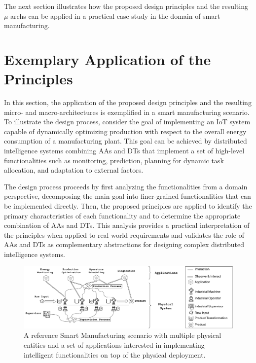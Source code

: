 The next section illustrates how the proposed design principles and the resulting $\mu$-archs can be applied in a practical case study in the domain of smart manufacturing.

\section{Exemplary Application of the Principles}

In this section, the application of the proposed design principles and the resulting micro- and macro-architectures is exemplified in a smart manufacturing scenario. To illustrate the design process, consider the goal of implementing an IoT system capable of dynamically optimizing production with respect to the overall energy consumption of a manufacturing plant.
%
This goal can be achieved by distributed intelligence systems combining AAs and DTs that implement a set of high-level functionalities such as monitoring, prediction, planning for dynamic task allocation, and adaptation to external factors.

The design process proceeds by first analyzing the functionalities from a domain perspective, decomposing the main goal into finer-grained functionalities that can be implemented directly. Then, the proposed principles are applied to identify the primary characteristics of each functionality and to determine the appropriate combination of AAs and DTs.
%
This analysis provides a practical interpretation of the principles when applied to real-world requirements and validates the role of AAs and DTs as complementary abstractions for designing complex distributed intelligence systems.

\begin{figure}
    \centering
    \includegraphics[width=\columnwidth]{figures/dt-mas/smart_manufacturing_scenario.pdf}
    \caption{A reference Smart Manufacturing scenario with multiple physical entities and a set of applications interested in implementing intelligent functionalities on top of the physical deployment.}
    \label{fig:smart_manufacturing_scenario}
\end{figure}

